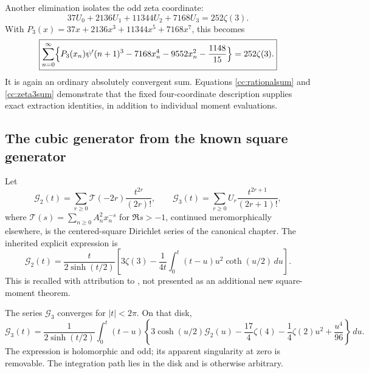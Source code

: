 Another elimination isolates the odd zeta coordinate:
\begin{equation}\label{cc:zeta3moment}
37U_0+2136U_1+11344U_2+7168U_3=252\zeta(3).
\end{equation}
With $P_3(x)=37x+2136x^3+11344x^5+7168x^7$, this becomes
\begin{equation}\label{cc:zeta3sum}
 \boxed{\begin{aligned}
 \sum_{n=0}^{\infty}\Bigl\{P_3(x_n)\psi'(n+1)^3
  -7168x_n^4-9552x_n^2-\frac{1148}{15}\Bigr\}
  =252\zeta(3).
 \end{aligned}}
\end{equation}
It is again an ordinary absolutely convergent sum. Equations
\eqref{cc:rationalsum} and \eqref{cc:zeta3sum} demonstrate that
the fixed four-coordinate description supplies exact extraction
identities, in addition to individual moment evaluations.

\subsection{The cubic generator from the known square generator}

Let
\[
 \mathcal G_2(t)=\sum_{r\ge0}\mathcal T(-2r)\frac{t^{2r}}{(2r)!},
 \qquad
 \mathcal G_3(t)=\sum_{r\ge0}U_r\frac{t^{2r+1}}{(2r+1)!},
\]
where $\mathcal T(s)=\sum_{n\ge0}A_n^2x_n^{-s}$ for $\Re s>-1$,
continued meromorphically elsewhere, is the centered-square Dirichlet
series of the canonical chapter. The inherited explicit expression is
\begin{equation}\label{cc:G2}
 \mathcal G_2(t)=\frac{t}{2\sinh(t/2)}
 \left[3\zeta(3)-\frac1{4t}
       \int_0^t(t-u)u^2\coth(u/2)\,du\right].
\end{equation}
This is recalled with attribution to \cite{cc:repo-square}, not
presented as an additional new square-moment theorem.

\begin{theorem}
\label{cc:generator}
The series $\mathcal G_3$ converges for $|t|<2\pi$.  On that disk,
\begin{equation}\label{cc:G3integral}
 \boxed{\displaystyle
 \mathcal G_3(t)=\frac1{2\sinh(t/2)}
 \int_0^t(t-u)\left\{
    3\cosh(u/2)\mathcal G_2(u)-\frac{17}{4}\zeta(4)
    -\frac14\zeta(2)u^2+\frac{u^4}{96}
 \right\}\,du.}
\end{equation}
The expression is holomorphic and odd; its apparent singularity at
zero is removable.  The integration path lies in the disk and is
otherwise arbitrary.
\end{theorem}

